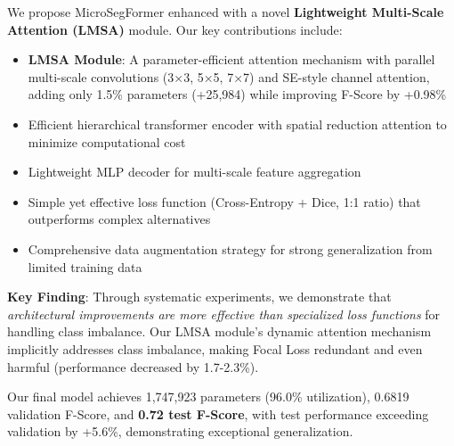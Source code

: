 We propose MicroSegFormer enhanced with a novel \textbf{Lightweight Multi-Scale Attention (LMSA)} module. Our key contributions include:

\begin{itemize}
    \item \textbf{LMSA Module}: A parameter-efficient attention mechanism with parallel multi-scale convolutions (3×3, 5×5, 7×7) and SE-style channel attention, adding only 1.5\% parameters (+25,984) while improving F-Score by +0.98\%
    \item Efficient hierarchical transformer encoder with spatial reduction attention to minimize computational cost
    \item Lightweight MLP decoder for multi-scale feature aggregation
    \item Simple yet effective loss function (Cross-Entropy + Dice, 1:1 ratio) that outperforms complex alternatives
    \item Comprehensive data augmentation strategy for strong generalization from limited training data
\end{itemize}

\textbf{Key Finding}: Through systematic experiments, we demonstrate that \textit{architectural improvements are more effective than specialized loss functions} for handling class imbalance. Our LMSA module's dynamic attention mechanism implicitly addresses class imbalance, making Focal Loss redundant and even harmful (performance decreased by 1.7-2.3\%).

Our final model achieves 1,747,923 parameters (96.0\% utilization), 0.6819 validation F-Score, and \textbf{0.72 test F-Score}, with test performance exceeding validation by +5.6\%, demonstrating exceptional generalization.

